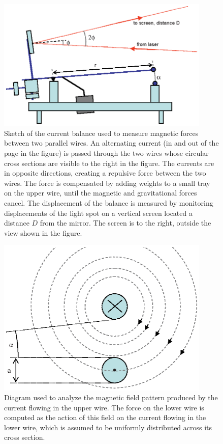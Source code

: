 \documentclass{revtex4}
\begin{document}
\begin{figure}
\includegraphics[width=4in]{curbal.eps}
\caption{\label{fig:curbal}
Sketch of the current balance used to measure magnetic forces between
two parallel wires.  An alternating current (in and out of the page in
the figure) is passed through the two wires
whose circular cross sections are visible to the right in the figure.  The
currents are in opposite directions, creating a repulsive force between the
two wires.  The force is compensated by adding weights to a small tray on
the upper wire, until the magnetic and gravitational forces cancel.
The displacement of the balance is
measured by monitoring displacements of the light spot on a vertical screen
located a distance $D$ from the mirror.  The screen is to the right, outside
the view shown in the figure.
}
\end{figure}

\begin{figure}
\includegraphics[width=4in]{bfield.eps}
\caption{\label{fig:bfield}
Diagram used to analyze the magnetic field pattern produced by the current
flowing in the upper wire.  The force on the lower wire is computed as the
action of this field on the current flowing in the lower wire, which is
assumed to be uniformly distributed across its cross section.
}
\end{figure}
\end{document}

